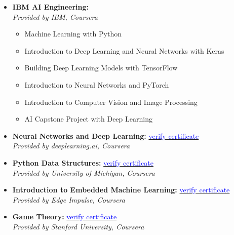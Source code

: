 \documentclass[12pt]{article}
\begin{document}
\begin{itemize}
		\vspace{8pt}
	\item \textbf{IBM AI Engineering:} \\
	\textit{Provided by IBM, Coursera}
	\begin{itemize}
		\item Machine Learning with Python
		\item Introduction to Deep Learning and Neural Networks with Keras
		\item Building Deep Learning Models with TensorFlow
		\item Introduction to Neural Networks and PyTorch
		\item Introduction to Computer Vision and Image Processing
		\item AI Capstone Project with Deep Learning
	\end{itemize}
	\item \textbf{Neural Networks and Deep Learning:}
	\hfill
	\href{https://coursera.org/share/8d9110917e9443857718534087a51190}{\textcolor{blue}{verify certificate}}
	\\
	\textit{Provided by deeplearning.ai, Coursera}
	\vspace{8pt}
	\item \textbf{Python Data Structures:}
	\hfill
	\href{https://coursera.org/share/8944f2b056a3405c606e509e61f5570e}{\textcolor{blue}{verify certificate}}
	\\
	\textit{Provided by University of Michigan, Coursera}
	\vspace{8pt}
	\item \textbf{Introduction to Embedded Machine Learning:}
	\hfill
	\href{https://coursera.org/share/0b709e9d6305db689ca5018f1531f4ef}{\textcolor{blue}{verify certificate}}
	\\
	\textit{Provided by Edge Impulse, Coursera}
	\vspace{8pt}
	\item \textbf{Game Theory:}
	\hfill
	\href{https://coursera.org/share/7c342a051890483df7748d65ad0113c2}{\textcolor{blue}{verify certificate}}
	\\
	\textit{Provided by Stanford University, Coursera}
\end{itemize}
\end{document}
